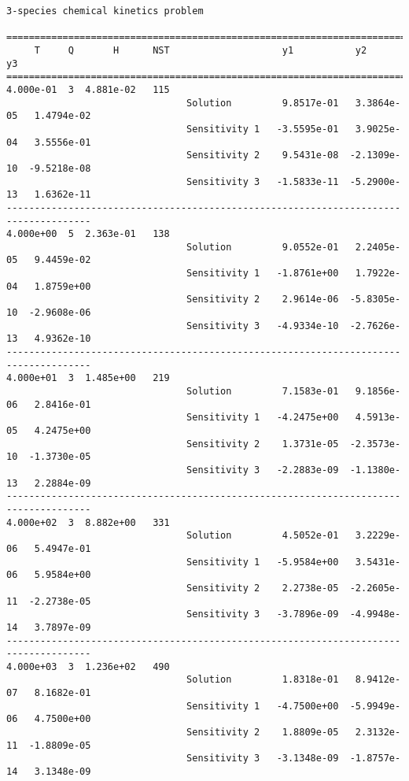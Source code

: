\begin{verbatim}
3-species chemical kinetics problem

=====================================================================================
     T     Q       H      NST                    y1           y2           y3    
=====================================================================================
4.000e-01  3  4.881e-02   115
                                Solution         9.8517e-01   3.3864e-05   1.4794e-02 
                                Sensitivity 1   -3.5595e-01   3.9025e-04   3.5556e-01 
                                Sensitivity 2    9.5431e-08  -2.1309e-10  -9.5218e-08 
                                Sensitivity 3   -1.5833e-11  -5.2900e-13   1.6362e-11 
-------------------------------------------------------------------------------------
4.000e+00  5  2.363e-01   138
                                Solution         9.0552e-01   2.2405e-05   9.4459e-02 
                                Sensitivity 1   -1.8761e+00   1.7922e-04   1.8759e+00 
                                Sensitivity 2    2.9614e-06  -5.8305e-10  -2.9608e-06 
                                Sensitivity 3   -4.9334e-10  -2.7626e-13   4.9362e-10 
-------------------------------------------------------------------------------------
4.000e+01  3  1.485e+00   219
                                Solution         7.1583e-01   9.1856e-06   2.8416e-01 
                                Sensitivity 1   -4.2475e+00   4.5913e-05   4.2475e+00 
                                Sensitivity 2    1.3731e-05  -2.3573e-10  -1.3730e-05 
                                Sensitivity 3   -2.2883e-09  -1.1380e-13   2.2884e-09 
-------------------------------------------------------------------------------------
4.000e+02  3  8.882e+00   331
                                Solution         4.5052e-01   3.2229e-06   5.4947e-01 
                                Sensitivity 1   -5.9584e+00   3.5431e-06   5.9584e+00 
                                Sensitivity 2    2.2738e-05  -2.2605e-11  -2.2738e-05 
                                Sensitivity 3   -3.7896e-09  -4.9948e-14   3.7897e-09 
-------------------------------------------------------------------------------------
4.000e+03  3  1.236e+02   490
                                Solution         1.8318e-01   8.9412e-07   8.1682e-01 
                                Sensitivity 1   -4.7500e+00  -5.9949e-06   4.7500e+00 
                                Sensitivity 2    1.8809e-05   2.3132e-11  -1.8809e-05 
                                Sensitivity 3   -3.1348e-09  -1.8757e-14   3.1348e-09 

\end{verbatim}

